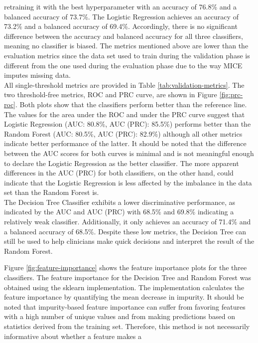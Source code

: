retraining it with the best hyperparameter with an accuracy of 76.8\% and a 
balanced accuracy of 73.7\%. The Logistic Regression achieves an accuracy of 
73.2\% and a balanced accuracy of 69.4\%. Accordingly, there is 
no significant difference between the accuracy and balanced accuracy for 
all three classifiers, meaning no classifier is biased.
The metrics mentioned above are lower than the evaluation metrics since the 
data 
set used to train during the validation phase is different from the one used 
during the evaluation phase due to the way MICE imputes missing data.
\\
All single-threshold metrics are provided in Table \ref{tab:validation-metrics}.
The two threshold-free metrics, ROC and PRC curve, are shown in Figure 
\ref{fig:prc-roc}. Both plots show that the classifiers perform better than the 
reference line. The values for the area under the ROC and under the PRC curve 
suggest that Logistic Regression (AUC: 80.8\%, AUC (PRC): 85.5\%) performs 
better than the Random Forest (AUC: 80.5\%, AUC (PRC): 82.9\%) although all 
other metrics indicate better performance of the latter. It 
should be noted that the difference between the AUC scores for both curves is 
minimal and is not meaningful enough to declare the Logistic Regression as the 
better classifier. The more apparent differences in the AUC (PRC) for both 
classifiers, on the other hand, could indicate that the Logistic Regression is 
less affected by the imbalance in the data set than the Random Forest is.
\\
The Decision Tree Classifier exhibits a lower discriminative performance,
as indicated by the AUC and AUC (PRC) with 68.5\% and 69.8\% 
indicating a relatively weak classifier. Additionally, it only 
achieves an accuracy of 71.4\% and a balanced accuracy of 68.5\%. Despite 
these low metrics, the Decision Tree can still be used to 
help clinicians make quick decisions and interpret the result of the Random 
Forest.
\par
Figure \ref{fig:feature-importance} shows the feature importance plots for the 
three classifiers. The feature importance for the Decision Tree and Random 
Forest was obtained using the sklearn implementation. The implementation 
calculates 
the feature importance by quantifying the mean decrease in impurity. 
It should be noted that impurity-based feature importance can suffer 
from favoring features with a high number of unique values and from making 
predictions based on statistics derived from the training set. Therefore, this 
method is not necessarily informative about whether a feature makes a 
